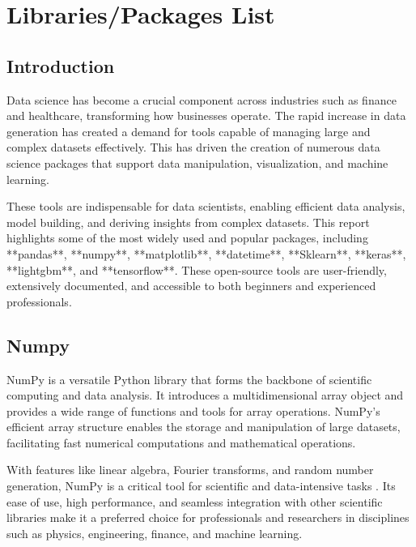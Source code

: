 %
%

\chapter{Libraries/Packages List}

\section{Introduction}

Data science has become a crucial component across industries such as finance and healthcare, transforming how businesses operate. The rapid increase in data generation has created a demand for tools capable of managing large and complex datasets effectively. This has driven the creation of numerous data science packages that support data manipulation, visualization, and machine learning.  

These tools are indispensable for data scientists, enabling efficient data analysis, model building, and deriving insights from complex datasets. This report highlights some of the most widely used and popular packages, including **pandas**, **numpy**, **matplotlib**, **datetime**, **Sklearn**, **keras**, **lightgbm**, and **tensorflow**. These open-source tools are user-friendly, extensively documented, and accessible to both beginners and experienced professionals.

\section{Numpy}

NumPy is a versatile Python library that forms the backbone of scientific computing and data analysis. It introduces a multidimensional array object and provides a wide range of functions and tools for array operations. NumPy's efficient array structure enables the storage and manipulation of large datasets, facilitating fast numerical computations and mathematical operations.  

With features like linear algebra, Fourier transforms, and random number generation, NumPy is a critical tool for scientific and data-intensive tasks \cite{McKinney:2012}. Its ease of use, high performance, and seamless integration with other scientific libraries make it a preferred choice for professionals and researchers in disciplines such as physics, engineering, finance, and machine learning.

